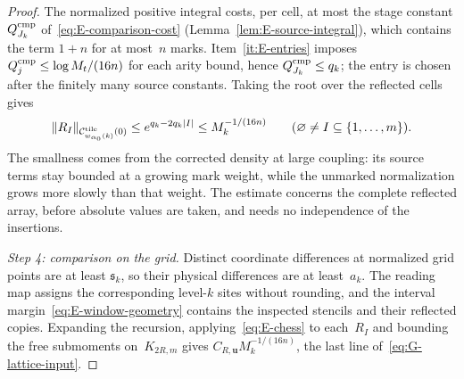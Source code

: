 \begin{proof}
The normalized positive integral costs, per cell, at most the stage constant $Q_{J_k}^{\rm cmp}$ of~\eqref{eq:E-comparison-cost} (Lemma~\ref{lem:E-source-integral}), which contains the term $1+n$ for at most~$n$ marks. Item~\ref{it:E-entries} imposes $Q_j^{\rm cmp}\le\log M_t/(16n)$ for each arity bound, hence $Q_{J_k}^{\rm cmp}\le q_k$; the entry is chosen after the finitely many source constants. Taking the root over the reflected cells gives
\begin{equation}\label{eq:G-source-root}
\|R_I\|_{\mathcal C^{\rm tile}_{w_{\alpha_0}(k)}(0)}
\le e^{q_k-2q_k|I|}\le M_k^{-1/(16n)}
\qquad(\varnothing\ne I\subseteq\{1,\ldots,m\}).
\end{equation}
The smallness comes from the corrected density at large coupling: its source terms stay bounded at a growing mark weight, while the unmarked normalization grows more slowly than that weight. The estimate concerns the complete reflected array, before absolute values are taken, and needs no independence of the insertions.

\emph{Step 4: comparison on the grid.} Distinct coordinate differences at normalized grid points are at least $\mathfrak s_k$, so their physical differences are at least~$a_k$. The reading map assigns the corresponding level-$k$ sites without rounding, and the interval margin~\eqref{eq:E-window-geometry} contains the inspected stencils and their reflected copies. Expanding the recursion, applying~\eqref{eq:E-chess} to each~$R_I$ and bounding the free submoments on~$K_{2R,m}$ gives $C_{R,\boldsymbol u}M_k^{-1/(16n)}$, the last line of~\eqref{eq:G-lattice-input}.


\end{proof}
